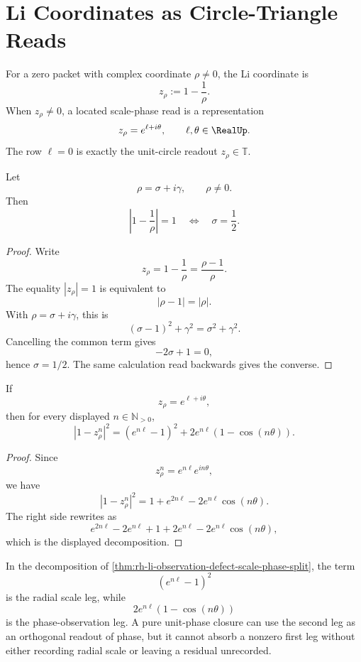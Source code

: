 \section{Li Coordinates as Circle-Triangle Reads}
\label{sec:rh-circle-triangle-li-coordinate}

\begin{definition}
\label{def:rh-li-zero-coordinate}
For a zero packet with complex coordinate $\rho\ne0$, the Li coordinate
is
$$
z_{\rho}
:=
1-\frac1{\rho}.
$$
When $z_{\rho}\ne0$, a located scale-phase read is a representation
$$
z_{\rho}=e^{\ell+i\theta},
\qquad
\ell,\theta\in\RealUp.
$$
The row $\ell=0$ is exactly the unit-circle readout
$z_{\rho}\in\mathbb T$.
\end{definition}

\begin{theorem}
\label{thm:rh-li-circle-criterion}
Let
$$
\rho=\sigma+i\gamma,
\qquad
\rho\ne0.
$$
Then
$$
\left|1-\frac1{\rho}\right|=1
\quad\Longleftrightarrow\quad
\sigma=\frac12.
$$
\end{theorem}

\begin{proof}
Write
$$
z_{\rho}=1-\frac1{\rho}=\frac{\rho-1}{\rho}.
$$
The equality $|z_{\rho}|=1$ is equivalent to
$$
|\rho-1|=|\rho|.
$$
With $\rho=\sigma+i\gamma$, this is
$$
(\sigma-1)^2+\gamma^2
=
\sigma^2+\gamma^2.
$$
Cancelling the common term gives
$$
-2\sigma+1=0,
$$
hence $\sigma=1/2$. The same calculation read backwards gives the
converse.
\end{proof}

\begin{theorem}
\label{thm:rh-li-observation-defect-scale-phase-split}
If
$$
z_{\rho}=e^{\ell+i\theta},
$$
then for every displayed $n\in\mathbb N_{>0}$,
$$
|1-z_{\rho}^n|^2
=
(e^{n\ell}-1)^2
+
2e^{n\ell}(1-\cos(n\theta)).
$$
\end{theorem}

\begin{proof}
Since
$$
z_{\rho}^n=e^{n\ell}e^{in\theta},
$$
we have
$$
|1-z_{\rho}^n|^2
=
1+e^{2n\ell}-2e^{n\ell}\cos(n\theta).
$$
The right side rewrites as
$$
e^{2n\ell}-2e^{n\ell}+1
+
2e^{n\ell}-2e^{n\ell}\cos(n\theta),
$$
which is the displayed decomposition.
\end{proof}

\begin{principle}
\label{prin:rh-li-scale-leg-radial-obstruction}
In the decomposition of
\autoref{thm:rh-li-observation-defect-scale-phase-split}, the term
$$
(e^{n\ell}-1)^2
$$
is the radial scale leg, while
$$
2e^{n\ell}(1-\cos(n\theta))
$$
is the phase-observation leg. A pure unit-phase closure can use the
second leg as an orthogonal readout of phase, but it cannot absorb a
nonzero first leg without either recording radial scale or leaving a
residual unrecorded.
\end{principle}

